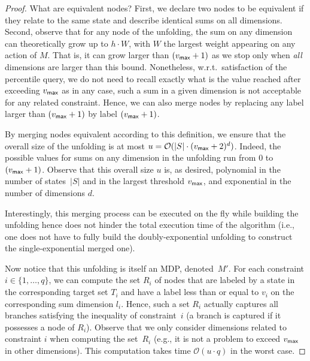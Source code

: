 \documentclass{llncs}
\newcommand{\states}{\ensuremath{S} }
\newcommand{\markovProcess}{\ensuremath{{M} }}
\newcommand{\dimension}{\ensuremath{d} }
\newcommand{\queries}{\ensuremath{q} }
\begin{document}
\begin{proof}
What are equivalent nodes? First, we declare two nodes to be equivalent if they relate to the same state and describe identical sums on all dimensions. Second, observe that for any node of the unfolding, the sum on any dimension can theoretically grow up to $h\cdot W$, with $W$ the largest weight appearing on any action of $\markovProcess$. That is, it can grow larger than $(v_{{\sf max}}+1)$ as we stop only when \textit{all} dimensions are larger than this bound. Nonetheless, w.r.t.~satisfaction of the percentile query, we do not need to recall exactly what is the value reached after exceeding $v_{{\sf max}}$ as in any case, such a sum in a given dimension is not acceptable for any related constraint. Hence, we can also merge nodes by replacing any label larger than $(v_{{\sf max}}+1)$ by label $(v_{{\sf max}}+1)$.

By merging nodes equivalent according to this definition, we ensure that the overall size of the unfolding is at most $u = \mathcal{O}(\vert \states \vert \cdot (v_{{\sf max}}+2)^{\dimension})$. Indeed, the possible values for sums on any dimension in the unfolding run from $0$ to $(v_{{\sf max}}+1)$. Observe that this overall size $u$ is, as desired, polynomial in the number of states~$\vert \states \vert$ and in the largest threshold $v_{{\sf max}}$, and exponential in the number of dimensions $d$.

Interestingly, this merging process can be executed on the fly while building the unfolding hence does not hinder the total execution time of the algorithm (i.e., one does not have to fully build the doubly-exponential unfolding to construct the single-exponential merged one).

Now notice that this unfolding is itself an MDP, denoted~$\markovProcess'$. For each constraint $i \in \{1, \ldots{}, q\}$, we can compute the set $R_{i}$ of nodes that are labeled by a state in the corresponding target set $T_{i}$ and have a label less than or equal to $v_{i}$ on the corresponding sum dimension $l_{i}$. Hence, such a set $R_{i}$ actually captures all branches satisfying the inequality of constraint~$i$ (a branch is captured if it possesses a node of $R_{i}$). Observe that we only consider dimensions related to constraint $i$ when computing the set~$R_i$ (e.g., it is not a problem to exceed $v_{{\sf max}}$ in other dimensions). This computation takes time $\mathcal{O}(u \cdot \queries)$ in the worst case.


\end{proof}
\end{document}

